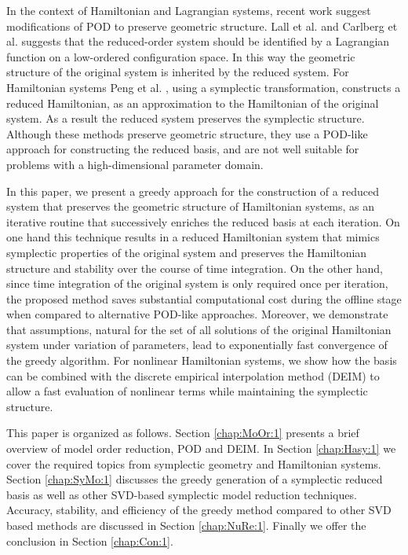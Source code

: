 In the context of Hamiltonian and Lagrangian systems, recent work suggest modifications of POD to preserve geometric structure. Lall et al. \cite{Lall:2003iy} and Carlberg et al. \cite{Carlberg:2014ky} suggests that the reduced-order system should be identified by a Lagrangian function on a low-ordered configuration space. In this way the geometric structure of the original system is inherited by the reduced system. For Hamiltonian systems Peng et al. \cite{Peng:2014di}, using a symplectic transformation, constructs a reduced Hamiltonian, as an approximation to the Hamiltonian of the original system. As a result the reduced system preserves the symplectic structure. Although these methods preserve geometric structure, they use a POD-like approach for constructing the reduced basis, and are not well suitable for problems with a high-dimensional parameter domain.

In this paper, we present a greedy approach for the construction of a reduced system that preserves the geometric structure of Hamiltonian systems, as an iterative routine that successively enriches the reduced basis at each iteration. On one hand this technique results in a reduced Hamiltonian system that mimics symplectic properties of the original system and preserves the Hamiltonian structure and stability over the course of time integration. On the other hand, since time integration of the original system is only required once per iteration, the proposed method saves substantial computational cost during the offline stage when compared to alternative POD-like approaches. Moreover, we demonstrate that assumptions, natural for the set of all solutions of the original Hamiltonian system under variation of parameters, lead to exponentially fast convergence of the greedy algorithm. For nonlinear Hamiltonian systems, we show how the basis can be combined with the discrete empirical interpolation method (DEIM) to allow a fast evaluation of nonlinear terms while maintaining the symplectic structure.

This paper is organized as follows. Section \ref{chap:MoOr:1} presents a brief overview of model order reduction, POD and DEIM. In Section \ref{chap:Hasy:1} we cover the required topics from symplectic geometry and Hamiltonian systems. Section \ref{chap:SyMo:1} discusses the greedy generation of a symplectic reduced basis as well as other SVD-based symplectic model reduction techniques. Accuracy, stability, and efficiency of the greedy method compared to other SVD based methods are discussed in Section \ref{chap:NuRe:1}. Finally we offer the conclusion in Section \ref{chap:Con:1}.
